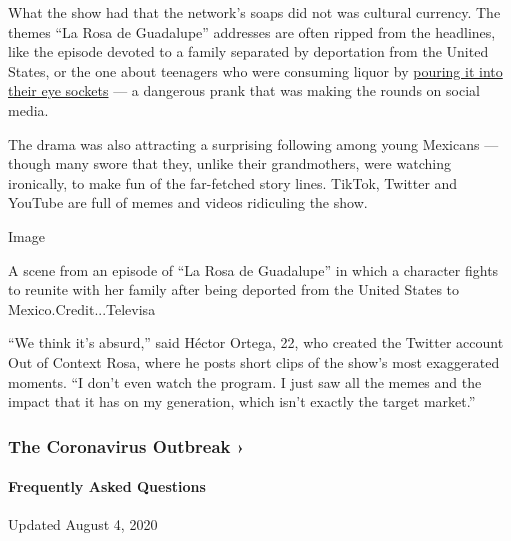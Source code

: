 What the show had that the network's soaps did not was cultural
currency. The themes ``La Rosa de Guadalupe'' addresses are often ripped
from the headlines, like the episode devoted to a family separated by
deportation from the United States, or the one about teenagers who were
consuming liquor by
\href{https://www.ncbi.nlm.nih.gov/pmc/articles/PMC4009175/}{pouring it
into their eye sockets} --- a dangerous prank that was making the rounds
on social media.

The drama was also attracting a surprising following among young
Mexicans --- though many swore that they, unlike their grandmothers,
were watching ironically, to make fun of the far-fetched story lines.
TikTok, Twitter and YouTube are full of memes and videos ridiculing the
show.

Image

A scene from an episode of ``La Rosa de Guadalupe'' in which a character
fights to reunite with her family after being deported from the United
States to Mexico.Credit...Televisa

``We think it's absurd,'' said Héctor Ortega, 22, who created the
Twitter account Out of Context Rosa, where he posts short clips of the
show's most exaggerated moments. ``I don't even watch the program. I
just saw all the memes and the impact that it has on my generation,
which isn't exactly the target market.''

\href{https://www.nytimes3xbfgragh.onion/news-event/coronavirus?action=click\&pgtype=Article\&state=default\&region=MAIN_CONTENT_3\&context=storylines_faq}{}

\hypertarget{the-coronavirus-outbreak-}{%
\subsubsection{The Coronavirus Outbreak
›}\label{the-coronavirus-outbreak-}}

\hypertarget{frequently-asked-questions}{%
\paragraph{Frequently Asked
Questions}\label{frequently-asked-questions}}

Updated August 4, 2020

